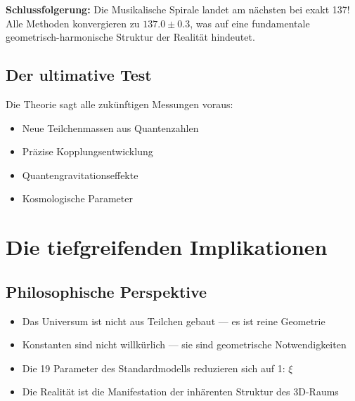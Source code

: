 	\begin{table}[h]
		\centering
		\caption{Detailanalyse der verschiedenen Ansätze}
	\end{table}
	
	\textbf{Schlussfolgerung:} Die Musikalische Spirale landet am nächsten bei exakt 137! Alle Methoden konvergieren zu $137.0 \pm 0.3$, was auf eine fundamentale geometrisch-harmonische Struktur der Realität hindeutet.
	
	\subsection{Der ultimative Test}
	
	Die Theorie sagt alle zukünftigen Messungen voraus:
	\begin{itemize}
		\item Neue Teilchenmassen aus Quantenzahlen
		\item Präzise Kopplungsentwicklung
		\item Quantengravitationseffekte
		\item Kosmologische Parameter
	\end{itemize}
	
	\section{Die tiefgreifenden Implikationen}
	
	\subsection{Philosophische Perspektive}
	
	\begin{tcolorbox}[colback=orange!5!white,colframe=orange!75!black,title=Das neue Verständnis]
		\begin{itemize}
			\item Das Universum ist nicht aus Teilchen gebaut — es ist reine Geometrie
			\item Konstanten sind nicht willkürlich — sie sind geometrische Notwendigkeiten
			\item Die 19 Parameter des Standardmodells reduzieren sich auf 1: $\xi$
			\item Die Realität ist die Manifestation der inhärenten Struktur des 3D-Raums
		\end{itemize}
	\end{tcolorbox}
	
